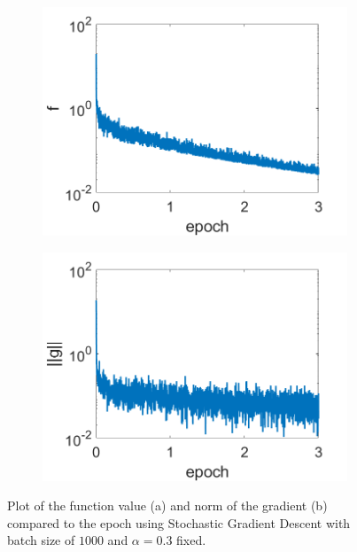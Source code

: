 \documentclass[12pt]{article}%
\begin{document}
\begin{figure}[H]
    \begin{subfigure}[b]{0.5\linewidth}
        \centering
        \includegraphics[width=\linewidth]{images/sg-f.png}
        \caption{}
        \label{CG:a}
        \vspace{4ex}
    \end{subfigure}%
    \begin{subfigure}[b]{0.5\linewidth}
        \centering
        \includegraphics[width=\linewidth]{images/sg-g.png}
        \caption{}
        \label{CG:b}
        \vspace{4ex}
    \end{subfigure}
    \caption{Plot of the function value (a) and norm of the gradient (b) compared to the epoch using Stochastic Gradient Descent with batch size of $1000$ and $\alpha = 0.3$ fixed.}
    \label{CG}
\end{figure}
\end{document}
